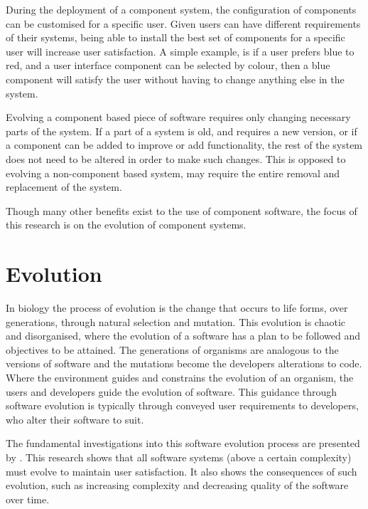During the deployment of a component system, the configuration of components can be customised for a specific user.
Given users can have different requirements of their systems, being able to install the best set of components for a specific user will increase user satisfaction.
A simple example, is if a user prefers blue to red, and a user interface component can be selected by colour, 
then a blue component will satisfy the user without having to change anything else in the system.

Evolving a component based piece of software requires only changing necessary parts of the system.
If a part of a system is old, and requires a new version, or if a component can be added to improve or add functionality,
the rest of the system does not need to be altered in order to make such changes.
This is opposed to evolving a non-component based system, may require the entire removal and replacement of the system.

Though many other benefits exist to the use of component software, the focus of this research is on the evolution of component systems.

\section{Evolution}
In biology the process of evolution is the change that occurs to life forms, over generations, through natural selection and mutation.
This evolution is chaotic and disorganised, where the evolution of a software has a plan to be followed and objectives to be attained.
The generations of organisms are analogous to the versions of software and the mutations become the developers alterations to code.
Where the environment guides and constrains the evolution of an organism, the users and developers guide the evolution of software.
This guidance through software evolution is typically through conveyed user requirements to developers, who alter their software to suit.

The fundamental investigations into this software evolution process are presented by \cite{lehman1980}.
This research shows that all software systems (above a certain complexity) must evolve to maintain user satisfaction.
It also shows the consequences of such evolution, such as increasing complexity and decreasing quality of the software over time.

